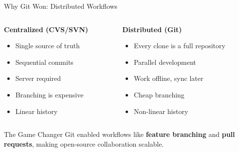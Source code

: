 \documentclass{beamer}
\begin{document}
\begin{frame}[t]{Why Git Won: Distributed Workflows}
\begin{columns}
    \begin{column}{0.5\textwidth}
        \textbf{Centralized (CVS/SVN)}
        \begin{itemize}
            \item Single source of truth
            \item Sequential commits
            \item Server required 
            \item Branching is expensive
            \item Linear history
        \end{itemize}
    \end{column}
    \begin{column}{0.5\textwidth}
        \textbf{Distributed (Git)}
        \begin{itemize}
            \item Every clone is a full repository
            \item Parallel development
            \item Work offline, sync later
            \item Cheap branching
            \item Non-linear history
        \end{itemize}
    \end{column}
\end{columns}

\begin{block}{The Game Changer}
Git enabled workflows like \textbf{feature branching} and \textbf{pull requests}, making open-source collaboration scalable.
\end{block}
\end{frame}
\end{document}
